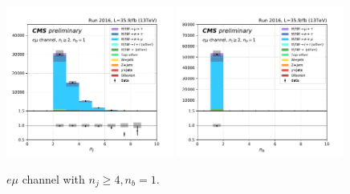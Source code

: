 \begin{figure}[ht]
    \includegraphics[width=0.49\textwidth]{chapters/Analysis/sectionPlots/figures/kinematics_pickles/emu2/1b/emu2_1b_nJets.pdf}
    \includegraphics[width=0.49\textwidth]{chapters/Analysis/sectionPlots/figures/kinematics_pickles/emu2/1b/emu2_1b_nBJets.pdf}
    
    \caption{$e\mu$ channel with $n_j\geq4, n_b=1$.}
\end{figure}


